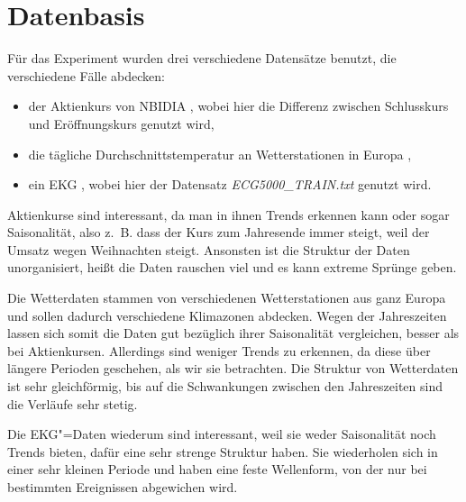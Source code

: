 \section{Datenbasis}
Für das Experiment wurden drei verschiedene Datensätze benutzt, die verschiedene Fälle abdecken: 
\begin{itemize}
    \item der Aktienkurs von NBIDIA \cite{nvidiaStock}, wobei hier die Differenz zwischen Schlusskurs und Eröffnungskurs genutzt wird,
    \item die tägliche Durchschnittstemperatur an Wetterstationen in Europa \cite{ecadWetterdaten},
    \item ein EKG \cite{ecg500}, wobei hier der Datensatz \textit{ECG5000\_TRAIN.txt} genutzt wird.
\end{itemize}

Aktienkurse sind interessant, da man in ihnen Trends erkennen kann oder sogar Saisonalität, also z.~B. dass der Kurs zum Jahresende immer steigt, weil der Umsatz wegen Weihnachten steigt. Ansonsten ist die Struktur der Daten unorganisiert, heißt die Daten rauschen viel und es kann extreme Sprünge geben.

Die Wetterdaten stammen von verschiedenen Wetterstationen aus ganz Europa und sollen dadurch verschiedene Klimazonen abdecken. Wegen der Jahreszeiten lassen sich somit die Daten gut bezüglich ihrer Saisonalität vergleichen, besser als bei Aktienkursen. Allerdings sind weniger Trends zu erkennen, da diese über längere Perioden geschehen, als wir sie betrachten. Die Struktur von Wetterdaten ist sehr gleichförmig, bis auf die Schwankungen zwischen den Jahreszeiten sind die Verläufe sehr stetig.

Die EKG"=Daten wiederum sind interessant, weil sie weder Saisonalität noch Trends bieten, dafür eine sehr strenge Struktur haben. Sie wiederholen sich in einer sehr kleinen Periode und haben eine feste Wellenform, von der nur bei bestimmten Ereignissen abgewichen wird.